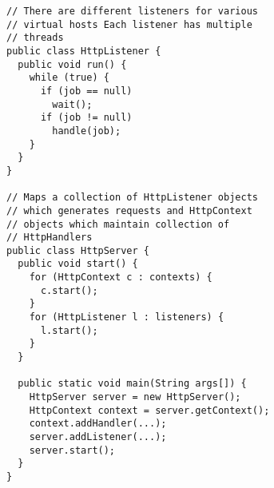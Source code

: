 \begin{lstlisting}[frame=single]
// There are different listeners for various
// virtual hosts Each listener has multiple
// threads
public class HttpListener {
  public void run() {
    while (true) {
      if (job == null)
        wait();
      if (job != null)
        handle(job);
    }
  }
}

// Maps a collection of HttpListener objects
// which generates requests and HttpContext
// objects which maintain collection of
// HttpHandlers
public class HttpServer {
  public void start() {
    for (HttpContext c : contexts) {
      c.start();
    }
    for (HttpListener l : listeners) {
      l.start();
    }
  }

  public static void main(String args[]) {
    HttpServer server = new HttpServer();
    HttpContext context = server.getContext();
    context.addHandler(...);
    server.addListener(...);
    server.start();
  }
}
\end{lstlisting}
